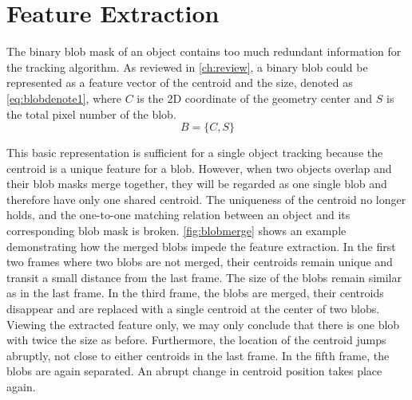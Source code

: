 \section{Feature Extraction} \label{sec:featureextract}
The binary blob mask of an object contains too much redundant information for the tracking algorithm. As reviewed in \autoref{ch:review}, a binary blob could be represented as a feature vector of the centroid and the size, denoted as \autoref{eq:blobdenote1}, where $C$ is the 2D coordinate of the geometry center and $S$ is the total pixel number of the blob.
\begin{equation}\label{eq:blobdenote1}
  B = \{C,S\}
\end{equation}

This basic representation is sufficient for a single object tracking because the centroid is a unique feature for a blob. However, when two objects overlap and their blob masks merge together, they will be regarded as one single blob and therefore have only one shared centroid. The uniqueness of the centroid no longer holds, and the one-to-one matching relation between an object and its corresponding blob mask is broken.
\autoref{fig:blobmerge} shows an example demonstrating how the merged blobs impede the feature extraction. In the first two frames where two blobs are not merged, their centroids remain unique and transit a small distance from the last frame. The size of the blobs remain similar as in the last frame. In the third frame, the blobs are merged, their centroids disappear and are replaced with a single centroid at the center of two blobs. Viewing the extracted feature only, we may only conclude that there is one blob with twice the size as before. Furthermore, the location of the centroid jumps abruptly, not close to either centroids in the last frame. In the fifth frame, the blobs are again separated. An abrupt change in centroid position takes place again.

